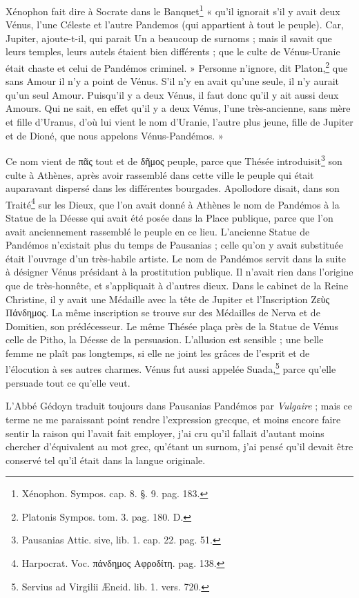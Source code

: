 \documentclass[a4paper, 18pt, oneside]{article}
\begin{document}
Xénophon fait dire à Socrate dans le Banquet\footnote{Xénophon. Sympos. cap. 8. §. 9. pag. 183.} « qu'il ignorait s'il y avait deux Vénus, l'une Céleste et l'autre Pandemos (qui appartient à tout le peuple). Car, Jupiter, ajoute-t-il, qui parait Un a beaucoup de surnoms ; mais il savait que leurs temples, leurs autels étaient bien différents ; que le culte de Vénus-Uranie était chaste et celui de Pandémos criminel. » Personne n'ignore, dit Platon,\footnote{Platonis Sympos. tom. 3. pag. 180. D.} que sans Amour il n'y a point de Vénus. S'il n'y en avait qu'une seule, il n'y aurait qu'un seul Amour. Puisqu'il y a deux Vénus, il faut donc qu'il y ait aussi deux Amours. Qui ne sait, en effet qu'il y a deux Vénus, l'une très-ancienne, sans mère et fille d'Uranus, d'où lui vient le nom d'Uranie, l'autre plus jeune, fille de Jupiter et de Dioné, que nous appelons Vénus-Pandémos. »

Ce nom vient de πᾶς tout et de δῆμος peuple, parce que Thésée introduisit\footnote{Pausanias Attic. sive, lib. 1. cap. 22. pag. 51.} son culte à Athènes, après avoir rassemblé dans cette ville le peuple qui était auparavant dispersé dans les différentes bourgades. Apollodore disait, dans son Traité\footnote{Harpocrat. Voc. πάνδημος Αφροδίτη. pag. 138.} sur les Dieux, que l'on avait donné à Athènes le nom de Pandémos à la Statue de la Déesse qui avait été posée dans la Place publique, parce que l'on avait anciennement rassemblé le peuple en ce lieu. L'ancienne Statue de Pandémos n'existait plus du temps de Pausanias ; celle qu'on y avait substituée était l'ouvrage d'un très-habile artiste. Le nom de Pandémos servit dans la suite à désigner Vénus présidant à la prostitution publique. Il n'avait rien dans l'origine que de très-honnête, et s'appliquait à d'autres dieux. Dans le cabinet de la Reine Christine, il y avait une Médaille avec la tête de Jupiter et l'Inscription Ζεὺς Πάνδημος. La même inscription se trouve sur des Médailles de Nerva et de Domitien, son prédécesseur. Le même Thésée plaça près de la Statue de Vénus celle de Pitho, la Déesse de la persuasion. L'allusion est sensible ; une belle femme ne plaît pas longtemps, si elle ne joint les grâces de l'esprit et de l'élocution à ses autres charmes. Vénus fut aussi appelée Suada,\footnote{Servius ad Virgilii Æneid. lib. 1. vers. 720.} parce qu'elle persuade tout ce qu'elle veut.

L'Abbé Gédoyn traduit toujours dans Pausanias Pandémos par \emph{Vulgaire} ; mais ce terme ne me paraissant point rendre l'expression grecque, et moins encore faire sentir la raison qui l'avait fait employer, j'ai cru qu'il fallait d'autant moins chercher d'équivalent au mot grec, qu'étant un surnom, j'ai pensé qu'il devait être conservé tel qu'il était dans la langue originale.
\end{document}

